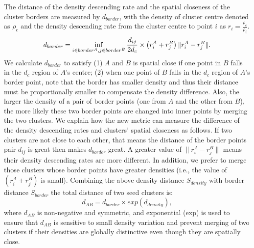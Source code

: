\documentclass{llncs}
\begin{document}
The distance of the density descending rate and the spatial closeness of the cluster borders are measured by $d_{border}$, with the density of cluster centre denoted as $\rho_{c}$ and the density descending rate from the cluster centre to point $i$ as $r_{i} = \frac{\rho_{c}}{\rho_{i}}$.
\begin{equation}
d_{border} = \inf_{i \in border^{A}, j \in border^{B}}\frac{d_{ij}}{2d_{c}}\times\left(r^{A}_{i} + r^{B}_{j}\right)\|r^{A}_{i} - r^{B}_{j}\|.
\label{eq:S_{border}}
\end{equation}
We calculate $d_{border}$ to satisfy (1) $A$ and $B$ is spatial close if one point in $B$ falls in the $d_{c}$ region of $A$'s centre; (2) when one point of $B$ falls in the $d_{c}$ region of $A$'s border point, note that the border has smaller density and thus their distance must be proportionally smaller to compensate the density difference. Also, the larger the density of a pair of border points (one from $A$ and the other from $B$), the more likely these two border points are changed into inner points by merging the two clusters.
We explain how the new metric can measure the difference of the density descending rates and clusters' spatial closeness as follows. If two clusters are not close to each other, that means the distance of the border points pair $d_{ij}$ is great then makes $d_{border}$ great. A greater value of $\|r^{A}_{i} - r^{B}_{j}\|$ means their density descending rates are more different. In addition, we prefer to merge those clusters whose border points have greater densities (i.e., the value of $\left(r^{A}_{i} + r^{B}_{j}\right)$ is small).
Combining the above density distance $S_{density}$ with border distance $S_{border}$ the total distance of two seed clusters is:
%
\begin{equation}
d_{AB} = d_{border} \times exp\left(d_{density}\right),
\label{eq:distance}
\end{equation}
where $d_{AB}$ is non-negative and symmetric, and exponential (exp) is used to ensure that $d_{AB}$ is sensitive to small density variation and prevent merging of two clusters if their densities are globally distinctive even though they are spatially close.
\end{document}
